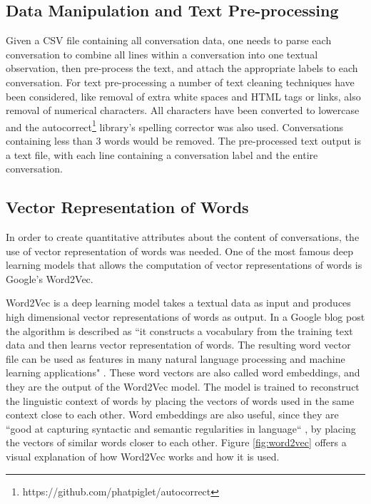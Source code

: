\documentclass[11pt]{article}
\begin{document}
\subsection{Data Manipulation and Text Pre-processing}
Given a CSV file containing all conversation data, one needs to parse each conversation to combine all lines within a conversation into one textual observation, then pre-process the text, and attach the appropriate labels to each conversation. For text pre-processing a number of text cleaning techniques have been considered, like removal of extra white spaces and HTML tags or links, also removal of numerical characters. All characters have been converted to lowercase and the autocorrect\footnote{https://github.com/phatpiglet/autocorrect} \cite{mccallum_2016} library's spelling corrector was also used. Conversations containing less than 3 words would be removed. The pre-processed text output is a text file, with each line containing a conversation label and the entire conversation.


\subsection{Vector Representation of Words}
In order to create quantitative attributes about the content of conversations, the use of vector representation of words was needed. One of the most famous deep learning models that allows the computation of vector representations of words is Google's Word2Vec.

Word2Vec is a deep learning model takes a textual data as input and produces high dimensional vector representations of words as output. In a Google blog post the algorithm is described as ``it constructs a vocabulary from the training text data and then learns vector representation of words. The resulting word vector file can be used as features in many natural language processing and machine learning applications" \cite{mikolov_2013}. 
These word vectors are also called word embeddings, and they are the output of the Word2Vec model. The model is trained to reconstruct the linguistic context of words by placing the vectors of words used in the same context close to each other. Word embeddings are also useful, since they are ``good at capturing syntactic and semantic regularities in language`` \cite{mikolov2013linguistic}, by placing the vectors of similar words closer to each other. Figure \ref{fig:word2vec} offers a visual explanation of how Word2Vec works and how it is used.
\end{document}

